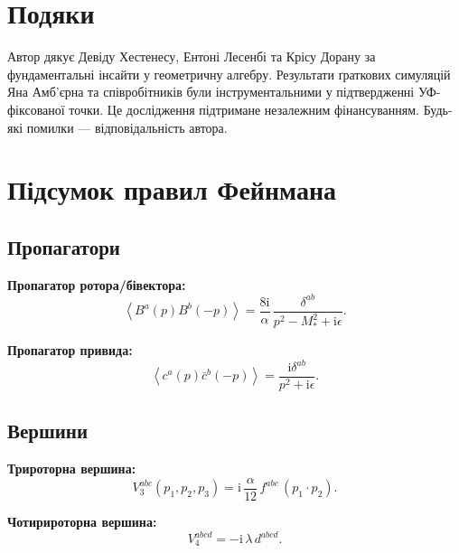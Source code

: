 \documentclass[11pt,a4paper]{article}
\numberwithin{equation}{section}
\theoremstyle{plain}
\theoremstyle{definition}
\theoremstyle{remark}
\newcommand{\ii}{\mathrm{i}}
\newcommand{\avg}[1]{\left\langle #1 \right\rangle}
\begin{document}
\section*{Подяки}

Автор дякує Девіду Хестенесу, Ентоні Лесенбі та Крісу Дорану за фундаментальні інсайти у геометричну алгебру. Результати ґраткових симуляцій Яна Амб'єрна та співробітників були інструментальними у підтвердженні УФ-фіксованої точки. Це дослідження підтримане незалежним фінансуванням. Будь-які помилки — відповідальність автора.

\vspace{1em}

\appendix

\section{Підсумок правил Фейнмана}\label{app:feynman}

\subsection{Пропагатори}

\textbf{Пропагатор ротора/бівектора:}
\begin{equation}
\avg{B^a(p)B^b(-p)} = \frac{8\ii}{\alpha}\,\frac{\delta^{ab}}{p^2 - M_*^2 + \ii\epsilon}.
\label{eq:prop-summary}
\end{equation}

\textbf{Пропагатор привида:}
\begin{equation}
\avg{c^a(p)\bar c^b(-p)} = \frac{\ii\delta^{ab}}{p^2+\ii\epsilon}.
\label{eq:ghost-prop-summary}
\end{equation}

\subsection{Вершини}

\textbf{Трироторна вершина:}
\begin{equation}
V_3^{abc}(p_1,p_2,p_3) = \ii\,\frac{\alpha}{12}\,f^{abc}\,(p_1\cdot p_2).
\label{eq:V3-summary}
\end{equation}

\textbf{Чотирироторна вершина:}
\begin{equation}
V_4^{abcd} = -\ii\,\lambda\,d^{abcd}.
\label{eq:V4-summary}
\end{equation}
\end{document}
